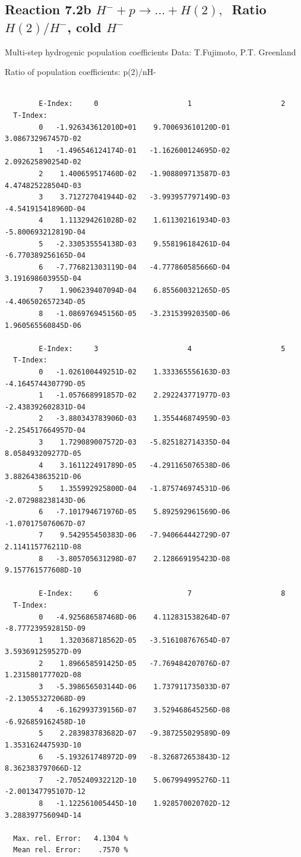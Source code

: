 \documentclass[12pt,dvips]{article}
\begin{document}
\subsection{
Reaction 7.2b $ H^- + p \rightarrow ...+ H(2) , \  $
Ratio $H(2)/H^- $, cold $H^-$
}
 Multi-step hydrogenic population coefficients
 Data: T.Fujimoto, P.T. Greenland

 Ratio of population coefficients: p(2)/nH-

\begin{small}\begin{verbatim}

        E-Index:     0                     1                     2
  T-Index:
        0   -1.926343612010D+01    9.700693610120D-01    3.086732967457D-02
        1   -1.496546124174D-01   -1.162600124695D-02    2.092625890254D-02
        2    1.400659517460D-02   -1.908809713587D-03    4.474825228504D-03
        3    3.712727041944D-02   -3.993957797149D-03   -4.541915418960D-04
        4    1.113294261028D-02    1.611302161934D-03   -5.800693212819D-04
        5   -2.330535554138D-03    9.558196184261D-04   -6.770389256165D-04
        6   -7.776821303119D-04   -4.777860585666D-04    3.191698603955D-04
        7    1.906239407094D-04    6.855600321265D-05   -4.406502657234D-05
        8   -1.086976945156D-05   -3.231539920350D-06    1.960565560845D-06

        E-Index:     3                     4                     5
  T-Index:
        0   -1.026100449251D-02    1.333365556163D-03   -4.164574430779D-05
        1   -1.057668991857D-02    2.292243771977D-03   -2.438392602831D-04
        2   -3.880343783906D-03    1.355446874959D-03   -2.254517664957D-04
        3    1.729089007572D-03   -5.825182714335D-04    8.058493209277D-05
        4    3.161122491789D-05   -4.291165076538D-06    3.882643863521D-06
        5    1.355992925800D-04   -1.875746974531D-06   -2.072988238143D-06
        6   -7.101794671976D-05    5.892592961569D-06   -1.070175076067D-07
        7    9.542955450383D-06   -7.940664442729D-07    2.114115776211D-08
        8   -3.805705631298D-07    2.128669195423D-08    9.157761577608D-10

        E-Index:     6                     7                     8
  T-Index:
        0   -4.925686587468D-06    4.112831538264D-07   -8.777239592815D-09
        1    1.320368718562D-05   -3.516108767654D-07    3.593691259527D-09
        2    1.896658591425D-05   -7.769484207076D-07    1.231580177702D-08
        3   -5.398656503144D-06    1.737911735033D-07   -2.130553272068D-09
        4   -6.162993739156D-07    3.529468645256D-08   -6.926859162458D-10
        5    2.283983783682D-07   -9.387255029589D-09    1.353162447593D-10
        6   -5.193261748972D-09   -8.326872653843D-12    8.362383797066D-12
        7   -2.705240932212D-10    5.067994995276D-11   -2.001347795107D-12
        8   -1.122561005445D-10    1.928570020702D-12    3.288397756094D-14

  Max. rel. Error:   4.1304 %
  Mean rel. Error:    .7570 %



\end{verbatim}\end{small}
\end{document}

